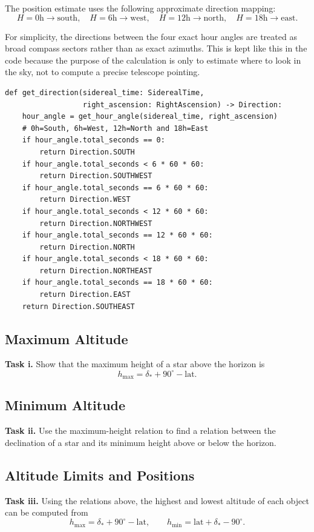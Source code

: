 \documentclass[a4paper,11pt]{article}
\begin{document}
The position estimate uses the following approximate direction mapping:
\[
    H = 0\mathrm{h} \rightarrow \mathrm{south}, \quad
    H = 6\mathrm{h} \rightarrow \mathrm{west}, \quad
    H = 12\mathrm{h} \rightarrow \mathrm{north}, \quad
    H = 18\mathrm{h} \rightarrow \mathrm{east}.
\]

For simplicity, the directions between the four exact hour angles are treated as broad compass sectors rather than as exact azimuths. This is kept like this in the code because the purpose of the calculation is only to estimate where to look in the sky, not to compute a precise telescope pointing.

\begin{lstlisting}[style=reportpython]
def get_direction(sidereal_time: SiderealTime,
                  right_ascension: RightAscension) -> Direction:
    hour_angle = get_hour_angle(sidereal_time, right_ascension)
    # 0h=South, 6h=West, 12h=North and 18h=East
    if hour_angle.total_seconds == 0:
        return Direction.SOUTH
    if hour_angle.total_seconds < 6 * 60 * 60:
        return Direction.SOUTHWEST
    if hour_angle.total_seconds == 6 * 60 * 60:
        return Direction.WEST
    if hour_angle.total_seconds < 12 * 60 * 60:
        return Direction.NORTHWEST
    if hour_angle.total_seconds == 12 * 60 * 60:
        return Direction.NORTH
    if hour_angle.total_seconds < 18 * 60 * 60:
        return Direction.NORTHEAST
    if hour_angle.total_seconds == 18 * 60 * 60:
        return Direction.EAST
    return Direction.SOUTHEAST
\end{lstlisting}

\subsection{Maximum Altitude}
\textbf{Task i.} Show that the maximum height of a star above the horizon is
\[
    h_{\max} = \delta_* + 90^\circ - \mathrm{lat}.
\]



\subsection{Minimum Altitude}
\textbf{Task ii.} Use the maximum-height relation to find a relation between the declination of a star and its minimum height above or below the horizon.



\subsection{Altitude Limits and Positions}
\textbf{Task iii.} Using the relations above, the highest and lowest altitude of each object can be computed from
\[
    h_{\max} = \delta_* + 90^\circ - \mathrm{lat},
    \qquad
    h_{\min} = \mathrm{lat} + \delta_* - 90^\circ.
\]
\end{document}

